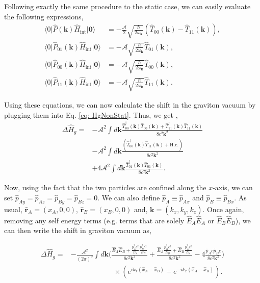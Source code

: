 \documentclass[12pt,a4paper]{report}
\theoremstyle{plain}
\theoremstyle{definition}
\theoremstyle{remark}
\begin{document}
Following exactly the same procedure to the static case, we can easily evaluate the following expressions,
\begin{align}
    \langle0\vert\hat{P}(\bm{k})\hat{H}_{\text{int}}\vert\bm{0}\rangle & = - \frac{\mathcal{A}}{2}\sqrt{\frac{\hbar}{2\omega_{\bm{k}}}}(\hat{T}_{00}(\bm{k})-\hat{T}_{11}(\bm{k})),\label{eq:expectation1}\\
\langle0\vert\hat{P}_{01}(\bm{k})\hat{H}_{\text{int}}\vert\bm{0}\rangle & = - \mathcal{A}\sqrt{\frac{\hbar}{2\omega_{\bm{k}}}}\hat{T}_{01}(\bm{k}),\\
\langle0\vert\hat{P}_{00}(\bm{k})\hat{H}_{\text{int}}\vert\bm{0}\rangle & = - \mathcal{A}\sqrt{\frac{\hbar}{2\omega_{\bm{k}}}}\hat{T}_{00}(\bm{k}),\\
\langle0\vert\hat{P}_{11}(\bm{k})\hat{H}_{\text{int}}\vert\bm{0}\rangle & = - \mathcal{A}\sqrt{\frac{\hbar}{2\omega_{\bm{k}}}}\hat{T}_{11}(\bm{k}).\label{eq:expectation3}
\end{align}

Using these equations, we can now calculate the shift in the graviton vacuum by plugging them into Eq. \ref{eq: HgNonStat}. Thus, we get \cite{Bose_2022},
\begin{equation}
    \begin{aligned}
        \Delta\hat{H}_{g}= & -\mathcal{A}^{2}\int d\bm{k}\frac{\hat{T}_{00}^{\dagger}(\bm{k})\hat{T}_{00}(\bm{k})+\hat{T}_{11}^{\dagger}(\bm{k})\hat{T}_{11}(\bm{k})}{8c^{2}\bm{k}^{2}} \\
 & -\mathcal{A}^{2}\int d\bm{k}\frac{(\hat{T}_{00}^{\dagger}(\bm{k})\hat{T}_{11}(\bm{k})+\text{H.c.})}{8c^{2}\bm{k}^{2}} \\
 & +4\mathcal{A}^{2}\int d\bm{k}\frac{\hat{T}_{01}^{\dagger}(\bm{k})\hat{T}_{01}(\bm{k})}{8c^{2}\bm{k}^{2}}.\label{eq:dH3}
    \end{aligned}
\end{equation}

Now, using the fact that the two particles are confined along the $x$-axis, we can set ${\hat{p}}_{Ay}={\hat{p}}_{Az}={\hat{p}}_{By}={\hat{p}}_{Bz}=0$. We can also define ${\hat{p}}_{A}\equiv{\hat{p}}_{Ax}$ and ${\hat{p}}_{B}\equiv{\hat{p}}_{Bx}$. As usual, ${\hat{\bm{r}}}_{A}=({x}_{A},0,0)$, ${\hat{\bm{r}}}_{B}=({x}_{B},0,0)$
and, $\bm{k}=(k_{x},k_{y},k_{z})$. Once again, removing any self energy terms (e.g. terms that are solely $\hat{E}_{A}\hat{E}_{A}$ or $\hat{E}_{B}\hat{E}_{B}$), we can then write the shift in graviton vacuum as,

\begin{equation}
    \begin{aligned}
    \Delta\hat{H}_{g}= & -\frac{\mathcal{A}^{2}}{(2\pi)^{3}}\int d\bm{k}\Bigg(\frac{\hat{E}_{A}\hat{E}_{B}+\frac{\hat{p}_{A}^{2}c^{2}}{E_{A}}\frac{\hat{p}_{B}^{2}c^{2}}{E_{B}}}{8c^{2}\bm{k}^{2}} +\frac{\hat{E}_{A}\frac{\hat{p}_{B}^{2}c^{2}}{E_{B}}+\hat{E}_{B}\frac{\hat{p}_{A}^{2}c^{2}}{E_{A}}}{8c^{2}\bm{k}^{2}}-4\frac{\hat{p}_{A}c\hat{p}_{B}c}{8c^{2}\bm{k}^{2}}\Bigg) \\
 & \qquad\qquad\qquad \times (e^{ik_{x}(\hat{x}_{A}-\hat{x}_{B})}+e^{-ik_{x}(\hat{x}_{A}-\hat{x}_{B})}).
    \end{aligned}
\end{equation}
\end{document}
